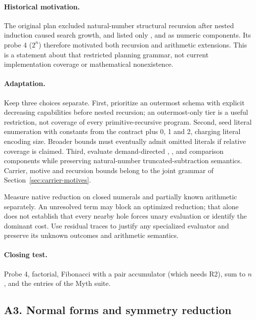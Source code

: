 \paragraph{Historical motivation.} The original plan excluded natural-number
structural recursion after nested induction caused search growth, and listed
only ,  and  as numeric components.
Its probe 4 ($2^n$) therefore motivated both recursion and arithmetic extensions.
This is a statement about that restricted planning grammar, not current
implementation coverage or mathematical nonexistence.

\paragraph{Adaptation.} Keep three choices separate. First, prioritize an
outermost  schema with explicit decreasing capabilities before
nested recursion; an outermost-only tier is a useful restriction, not coverage
of every primitive-recursive program. Second, seed literal enumeration with
constants from the contract plus 0, 1 and 2, charging literal encoding size.
Broader bounds must eventually admit omitted literals if relative coverage is
claimed. Third, evaluate demand-directed , ,
 and comparison components while preserving natural-number
truncated-subtraction semantics. Carrier, motive and recursion bounds belong
to the joint grammar of Section~\ref{sec:carrier-motives}.

Measure native reduction on closed numerals and partially known arithmetic
separately. An unresolved term may block an optimized reduction; that alone
does not establish that every nearby hole forces unary evaluation or identify
the dominant cost. Use residual traces to justify any specialized evaluator
and preserve its unknown outcomes and arithmetic semantics.

\paragraph{Closing test.} Probe 4, factorial, Fibonacci with a pair accumulator (which needs R2), sum to $n$, and the  entries of the Myth suite.

\subsection{A3. Normal forms and symmetry reduction}

